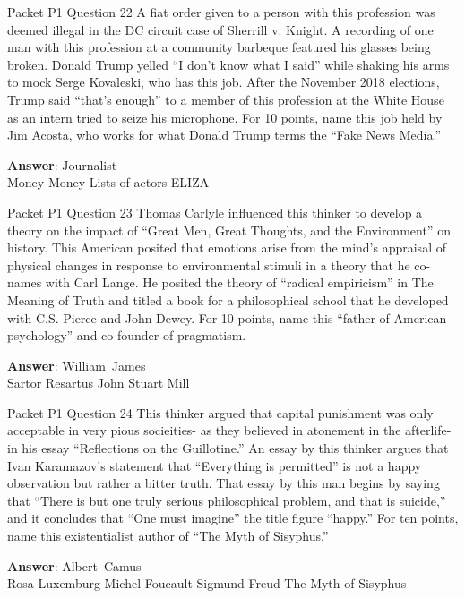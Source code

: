 \begin{frame}{Packet P1 Question 22}
A fiat order given to     a person with this profession was deemed illegal in the DC circuit case of Sherrill v. Knight. A recording of one man with this profession at a community barbeque featured his glasses being broken. Donald Trump yelled ``I don't know what I said'' while shaking his arms to mock Serge Kovaleski, who has this job. After the November 2018 elections, Trump said ``that's enough'' to a member of this profession at the White House as an intern tried to seize his microphone. For 10 points, name this job held by Jim Acosta, who works for what Donald Trump terms the ``Fake News Media.''    

\textbf{Answer}: Journalist\\
 Money
 Money
 Lists of actors
 ELIZA
\end{frame}

\begin{frame}{Packet P1 Question 23}
Thomas Carlyle influenced   this thinker to develop a theory on the impact of ``Great Men, Great Thoughts, and the Environment''   on history. This American posited that emotions arise from   the mind's appraisal of physical changes in response to environmental stimuli in a theory that he   co-names with Carl Lange. He posited the theory of ``radical empiricism'' in The Meaning   of Truth and titled a book for a philosophical school that he developed with C.S. Pierce and John Dewey. For 10 points, name this ``father of American psychology'' and co-founder   of pragmatism.

\textbf{Answer}: William\ James\\
 Sartor Resartus
 John Stuart Mill
\end{frame}

\begin{frame}{Packet P1 Question 24}
This thinker argued that   capital punishment   was only acceptable in very pious socieities- as they believed in atonement in the afterlife- in his essay ``Reflections   on the Guillotine.'' An essay by this thinker argues that Ivan   Karamazov's statement that ``Everything is permitted'' is not a happy observation but rather a bitter   truth. That essay by this man begins by saying that ``There is but one truly serious philosophical problem, and that is suicide,'' and it concludes that ``One must imagine'' the title   figure ``happy.'' For ten points, name this existentialist author of ``The Myth of Sisyphus.''

\textbf{Answer}: Albert\ Camus\\
 Rosa Luxemburg
 Michel Foucault
 Sigmund Freud
 The Myth of Sisyphus
\end{frame}

